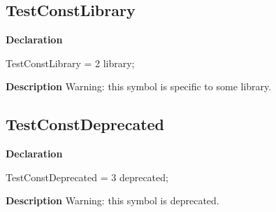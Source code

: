 \documentclass{report}
\begin{document}
\subsection*{TestConstLibrary}
\begin{list}{}{
\setlength{\itemindent}{0cm}
\setlength{\listparindent}{0cm}
\setlength{\leftmargin}{\evensidemargin}
\addtolength{\leftmargin}{\tmplength}
\settowidth{\labelsep}{X}
\addtolength{\leftmargin}{\labelsep}
\setlength{\labelwidth}{\tmplength}
}
\begin{flushleft}
\item[\textbf{Declaration}\hfill]
\begin{ttfamily}
TestConstLibrary = 2 library;\end{ttfamily}


\end{flushleft}
\par
\item[\textbf{Description}]
Warning: this symbol is specific to some library.

 

\end{list}
\subsection*{TestConstDeprecated}
\begin{list}{}{
\setlength{\itemindent}{0cm}
\setlength{\listparindent}{0cm}
\setlength{\leftmargin}{\evensidemargin}
\addtolength{\leftmargin}{\tmplength}
\settowidth{\labelsep}{X}
\addtolength{\leftmargin}{\labelsep}
\setlength{\labelwidth}{\tmplength}
}
\begin{flushleft}
\item[\textbf{Declaration}\hfill]
\begin{ttfamily}
TestConstDeprecated = 3 deprecated;\end{ttfamily}


\end{flushleft}
\par
\item[\textbf{Description}]
Warning: this symbol is deprecated.

 

\end{list}
\end{document}
